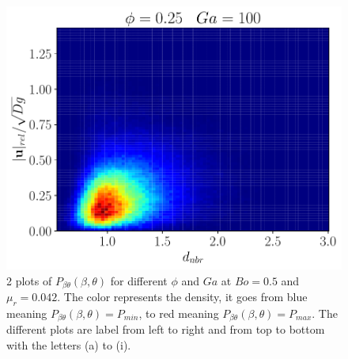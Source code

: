 \begin{figure}[h!]
    \includegraphics[height = \size]{image/N_10/beta/2DMAP_distmin_v_rel_dmax_10_Bo1PHI0_25mu_r0_42Ga100.pdf}
    \caption{2 plots of $P_{\beta\theta}(\beta,\theta)$ for different $\phi$ and $Ga$ at $Bo = 0.5$ and $\mu_r = 0.042$. The color represents the density, it goes from blue meaning $P_{\beta\theta}(\beta,\theta)= P_{min}$, to red meaning $P_{\beta\theta}(\beta,\theta) = P_{max}$. The different plots are label from left to right and from top to bottom with the letters (a) to (i).} 
    \label{fig:beta_u_rel_2D}
\end{figure} 

